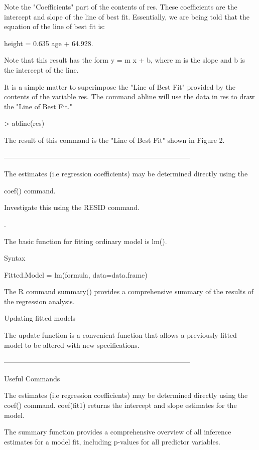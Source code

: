 Note the "Coefficients" part of the contents of res. These coefficients are the intercept and slope of the line of best fit. Essentially, we are being told that the equation of the line of best fit is:

height = 0.635 age + 64.928.

Note that this result has the form y = m x + b, where m is the slope and b is the intercept of the line.

It is a simple matter to superimpose the "Line of Best Fit" provided by the contents of the variable res. The command abline will use the data in res to draw the "Line of Best Fit."


> abline(res)



The result of this command is the "Line of Best Fit" shown in Figure 2.




--------------------------------------------------------------------------------



The estimates (i.e regression coefficients) may be determined directly using the

coef() command.


Investigate this using the RESID command.

.

The basic function for fitting ordinary model is lm().

Syntax

Fitted.Model = lm(formula, data=data.frame)

The R command summary() provides a comprehensive summary of the results of the regression analysis.

Updating fitted models

The update function is a convenient function that allows a previously fitted model to be altered with new specifications.







--------------------------------------------------------------------------------



Useful Commands

The estimates (i.e regression coefficients) may be determined directly using the coef() command. coef(fit1) returns the intercept and slope estimates for the model.


The summary function provides a comprehensive overview of all inference estimates for a model fit, including p-values for all predictor variables.


